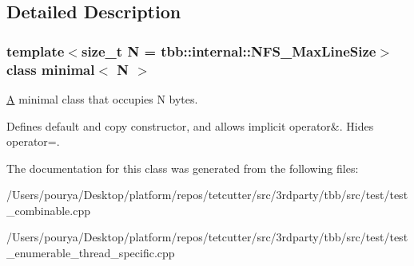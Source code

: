 \subsection{Detailed Description}
\subsubsection*{template$<$size\+\_\+t N = tbb\+::internal\+::\+N\+F\+S\+\_\+\+Max\+Line\+Size$>$class minimal$<$ N $>$}

\hyperlink{structA}{A} minimal class that occupies N bytes. 

Defines default and copy constructor, and allows implicit operator\&. Hides operator=. 

The documentation for this class was generated from the following files\+:\begin{DoxyCompactItemize}
\item 
/\+Users/pourya/\+Desktop/platform/repos/tetcutter/src/3rdparty/tbb/src/test/test\+\_\+combinable.\+cpp\item 
/\+Users/pourya/\+Desktop/platform/repos/tetcutter/src/3rdparty/tbb/src/test/test\+\_\+enumerable\+\_\+thread\+\_\+specific.\+cpp\end{DoxyCompactItemize}
